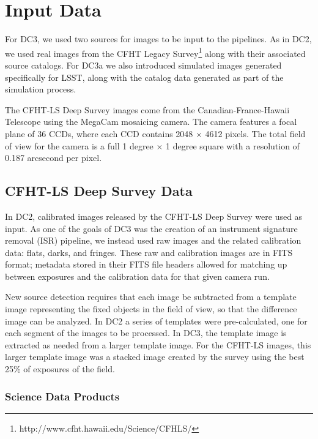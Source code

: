 
\section{Input Data}

For DC3, we used two sources for images to be input to the pipelines.
As in DC2, we used real images from the CFHT Legacy 
Survey\footnote{http://www.cfht.hawaii.edu/Science/CFHLS/} along 
with their associated source catalogs. For DC3a we also introduced 
simulated images generated specifically for LSST, along with the
catalog data generated as part of the simulation process.

The CFHT-LS Deep Survey images come from the Canadian-France-Hawaii
Telescope  using the MegaCam mosaicing camera. The camera
features a focal plane of 36 CCDs, where each CCD contains 2048
$\times$ 4612 pixels. The total field of view for the camera is
a full 1 degree $\times$ 1 degree square with a resolution of 0.187
arcsecond per pixel.


\subsection{CFHT-LS Deep Survey Data}

In DC2, calibrated images released by the CFHT-LS Deep Survey were used as 
input. As one of the goals of DC3 was the creation of an instrument signature 
removal (ISR) pipeline, we instead used raw images and the related 
calibration data: flats, darks, and fringes. These raw and calibration
images are in FITS format; metadata stored in their FITS file 
headers allowed for matching up between exposures and the calibration
data for that given camera run.

New source detection requires that each image be subtracted from a
template image representing the fixed objects in the field of view,
so that the difference image can be analyzed. In DC2 a series of 
templates were pre-calculated, one for each segment of the images to 
be processed. In DC3, the template image is extracted as needed
from a larger template image. For the CFHT-LS images, this larger
template image was a stacked image created by the survey using
the best 25\% of exposures of the field.



\subsubsection{Science Data Products}


